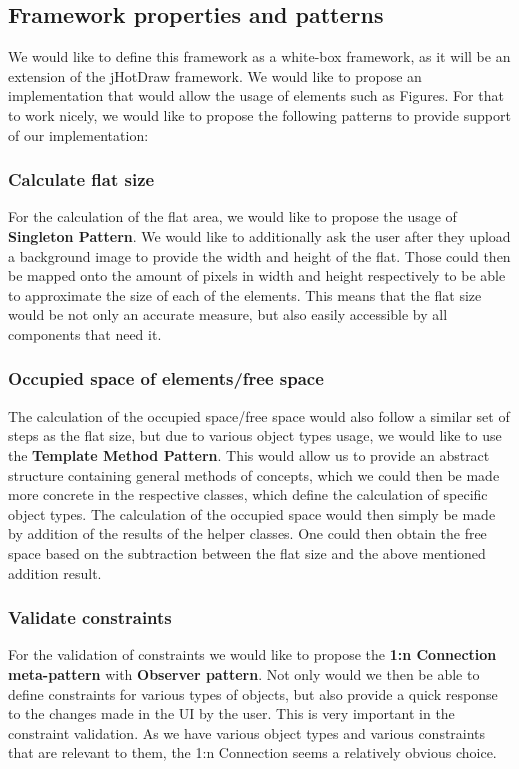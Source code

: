 \subsection{Framework properties and patterns}
We would like to define this framework as a white-box framework, as it will be an extension of the jHotDraw framework. We would like to propose an implementation that would allow the usage of elements such as Figures. For that to work nicely, we would like to propose the following patterns to provide support of our implementation:

\subsubsection{Calculate flat size}
For the calculation of the flat area, we would like to propose the usage of \textbf{Singleton Pattern}. We would like to additionally ask the user after they upload a background image to provide the width and height of the flat. Those could then be mapped onto the amount of pixels in width and height respectively to be able to approximate the size of each of the elements. This means that the flat size would be not only an accurate measure, but also easily accessible by all components that need it.

\subsubsection{Occupied space of elements/free space}
The calculation of the occupied space/free space would also follow a similar set of steps as the flat size, but due to various object types usage, we would like to use the \textbf{Template Method Pattern}. This would allow us to provide an abstract structure containing general methods of concepts, which we could then be made more concrete in the respective classes, which define the calculation of specific object types. The calculation of the occupied space would then simply be made by addition of the results of the helper classes. One could then obtain the free space based on the subtraction between the flat size and the above mentioned addition result.

\subsubsection{Validate constraints}
For the validation of constraints we would like to propose the \textbf{1:n Connection meta-pattern} with \textbf{Observer pattern}. Not only would we then be able to define constraints for various types of objects, but also provide a quick response to the changes made in the UI by the user. This is very important in the constraint validation. As we have various object types and various constraints that are relevant to them, the 1:n Connection seems a relatively obvious choice.

